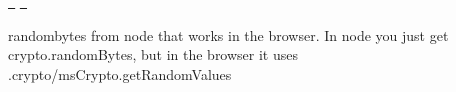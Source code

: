 \href{https://www.npmjs.org/package/randombytes}{\texttt{ }} \href{https://travis-ci.org/crypto-browserify/randombytes}{\texttt{ }}

randombytes from node that works in the browser. In node you just get crypto.\+random\+Bytes, but in the browser it uses .crypto/ms\+Crypto.\+get\+Random\+Values


\begin{DoxyCode}{0}
\DoxyCodeLine{\});}

\end{DoxyCode}
 